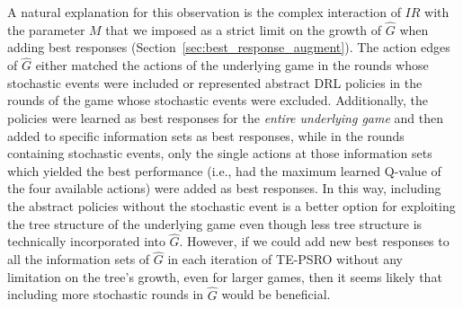 A natural explanation for this observation is the complex interaction of $IR$ with the parameter $M$ that we imposed as a strict limit on the growth of $\hat{G}$ when adding best responses (Section~\ref{sec:best_response_augment}). The action edges of $\hat{G}$ either matched the actions of the underlying game in the rounds whose stochastic events were included or represented abstract DRL policies in the rounds of the game whose stochastic events were excluded. Additionally, the policies were learned as best responses for the \textit{entire underlying game} and then added to specific information sets as best responses, while in the rounds containing stochastic events, only the single actions at those information sets which yielded the best performance (i.e., had the maximum learned Q-value of the four available actions) were added as best responses. In this way, including the abstract policies without the stochastic event is a better option for exploiting the tree structure of the underlying game even though less tree structure is technically incorporated into $\hat{G}$. However, if we could add new best responses to all the information sets of $\hat{G}$ in each iteration of TE-PSRO without any limitation on the tree's growth, even for larger games, then it seems likely that including more stochastic rounds in $\hat{G}$ would be beneficial.

